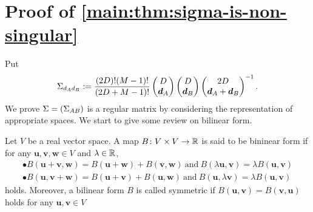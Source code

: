 \documentclass{article}
\begin{document}
\section{Proof of \texorpdfstring{\cref{main:thm:sigma-is-non-singular}}{Theorem 3}}\label{sec:proof-of-regularity}
Put
\begin{align}
\Sigma_{d_A d_B}
:=
\frac{(2D)!(M - 1)!}{(2D + M - 1)!}
 \begin{pmatrix}
  D \\
  \bm{d}_A
 \end{pmatrix}
 \begin{pmatrix}
  D \\
  {\bm d}_B
 \end{pmatrix}
 \begin{pmatrix}
  2D \\
  {\bm d}_A + {\bm d}_B
 \end{pmatrix}^{-1}.
\end{align}
We prove $\Sigma = (\Sigma_{AB})$ is a regular matrix by considering the representation of appropriate spaces.
We start to give some review on bilinear form.
\begin{defn}
Let $V$ be a real vector space. A map $B\colon V\times V \rightarrow \mathbb{R}$ is said to be bininear form if for any $\bm{u}, \bm{v}, \bm{w} \in V$ and $\lambda \in \mathbb{R}$,
\begin{eqnarray*}
\bullet B(\bm{u}+ \bm{v}, \bm{w}) = B(\bm{u}+\bm{w}) + B(\bm{v}, \bm{w})\ \text{and}\  B(\lambda \bm{u}, \bm{v}) = \lambda B(\bm{u}, \bm{v}) \\
\bullet B(\bm{u}, \bm{v}+\bm{w})  = B(\bm{u}+\bm{v}) + B(\bm{u}, \bm{w})\ \text{and}\  B( \bm{u},\lambda \bm{v}) = \lambda B(\bm{u}, \bm{v}) 
\end{eqnarray*}
holds. Moreover, a bilinear form $B$ is called symmetric if $B(\bm{u}, \bm{v})=B(\bm{v}, \bm{u})$ holds for any $\bm{u}, \bm{v} \in V$

\end{defn}
\end{document}
